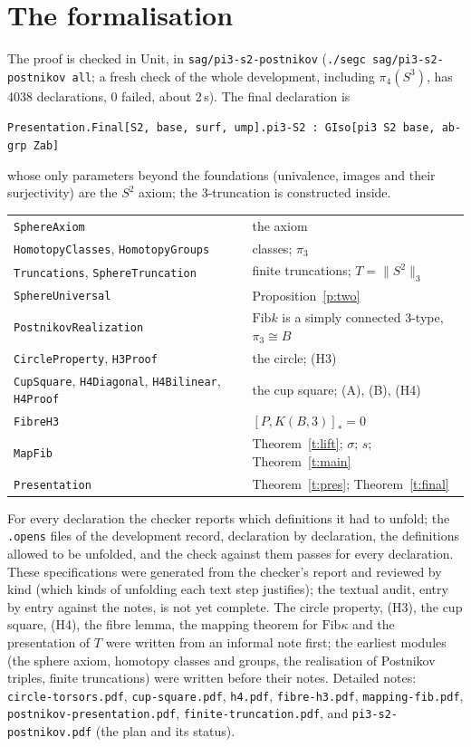 \documentclass[11pt]{amsart}
\theoremstyle{definition}
\theoremstyle{remark}
\newcommand{\code}[1]{\texttt{#1}}
\newcommand{\hc}[2]{[#1,#2]_*}
\newcommand{\Fib}{\mathrm{Fib}}
\newcommand{\tr}[1]{\|#1\|}
\begin{document}
\section{The formalisation}\label{s:formal}

The proof is checked in Unit, in \code{sag/pi3-s2-postnikov} (\code{./segc
sag/pi3-s2-postnikov all}; a fresh check of the whole development, including
$\pi_4(S^3)$, has 4038 declarations, 0 failed, about 2\,s). The final declaration is
\begin{center}
\code{Presentation.Final[S2, base, surf, ump].pi3-S2 : GIso[pi3 S2 base, ab-grp Zab]}
\end{center}
whose only parameters beyond the foundations (univalence, images and their surjectivity)
are the $S^2$ axiom; the 3-truncation is constructed inside.

\smallskip
\begin{tabular}{@{}ll@{}}
\code{SphereAxiom} & the axiom\\
\code{HomotopyClasses}, \code{HomotopyGroups} & classes; $\pi_3$\\
\code{Truncations}, \code{SphereTruncation} & finite truncations; $T=\tr{S^2}_3$\\
\code{SphereUniversal} & Proposition~\ref{p:two}\\
\code{PostnikovRealization} & $\Fib k$ is a simply connected 3-type, $\pi_3\cong B$\\
\code{CircleProperty}, \code{H3Proof} & the circle; (H3)\\
\code{CupSquare}, \code{H4Diagonal}, \code{H4Bilinear}, \code{H4Proof} & the cup square; (A), (B), (H4)\\
\code{FibreH3} & $\hc P{K(B,3)}=0$\\
\code{MapFib} & Theorem~\ref{t:lift}; $\sigma$; $s$; Theorem~\ref{t:main}\\
\code{Presentation} & Theorem~\ref{t:pres}; Theorem~\ref{t:final}
\end{tabular}

\smallskip
For every declaration the checker reports which definitions it had to unfold; the
\code{.opens} files of the development record, declaration by declaration, the
definitions allowed to be unfolded, and the check against them passes for every
declaration. These specifications were generated from the checker's report and reviewed
by kind (which kinds of unfolding each text step justifies); the textual audit, entry by
entry against the notes, is not yet complete. The circle property, (H3), the cup square,
(H4), the fibre lemma, the mapping theorem for $\Fib\kappa$ and the presentation of $T$
were written from an informal note first; the earliest modules (the sphere axiom,
homotopy classes and groups, the realisation of Postnikov triples, finite truncations)
were written before their notes. Detailed notes: \code{circle-torsors.pdf},
\code{cup-square.pdf}, \code{h4.pdf}, \code{fibre-h3.pdf}, \code{mapping-fib.pdf},
\code{postnikov-presentation.pdf}, \code{finite-truncation.pdf}, and
\code{pi3-s2-postnikov.pdf} (the plan and its status).
\end{document}
